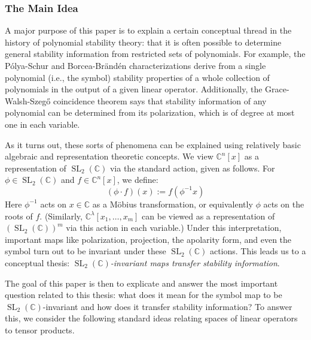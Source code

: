 \documentclass{article}
\newtheorem*{thesis}{Thesis}
\theoremstyle{definition}
\theoremstyle{plain}
\newcommand{\C}{\mathbb{C}}
\DeclareMathOperator{\SL}{SL}
\begin{document}
\subsubsection*{The Main Idea}

A major purpose of this paper is to explain a certain conceptual thread in the history of polynomial stability theory: that it is often possible to determine general stability information from restricted sets of polynomials. For example, the P{\'o}lya-Schur and Borcea-Br{\"a}nd{\'e}n characterizations derive from a single polynomial (i.e., the symbol) stability properties of a whole collection of polynomials in the output of a given linear operator. Additionally, the Grace-Walsh-Szeg{\H{o}} coincidence theorem says that stability information of any polynomial can be determined from its polarization, which is of degree at most one in each variable.

As it turns out, these sorts of phenomena can be explained using relatively basic algebraic and representation theoretic concepts. We view $\C^n[x]$ as a representation of $\SL_2(\C)$ via the standard action, given as follows. For $\phi \in \SL_2(\C)$ and $f \in \C^n[x]$, we define:
\[
    (\phi \cdot f)(x) := f(\phi^{-1}x)
\]
Here $\phi^{-1}$ acts on $x \in \C$ as a M{\"o}bius transformation, or equivalently $\phi$ acts on the roots of $f$. (Similarly, $\C^\lambda[x_1,\ldots,x_m]$ can be viewed as a representation of $(\SL_2(\C))^m$ via this action in each variable.) Under this interpretation, important maps like polarization, projection, the apolarity form, and even the symbol turn out to be invariant under these $\SL_2(\C)$ actions. This leads us to a conceptual thesis: \emph{$\SL_2(\C)$-invariant maps transfer stability information}.


The goal of this paper is then to explicate and answer the most important question related to this thesis: what does it mean for the symbol map to be $\SL_2(\C)$-invariant and how does it transfer stability information? To answer this, we consider the following standard ideas relating spaces of linear operators to tensor products.
\end{document}

